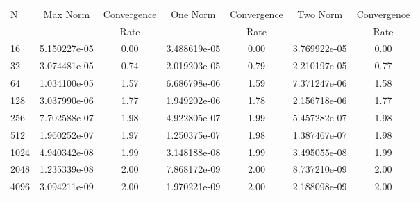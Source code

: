 \documentclass[12pt]{article}
\begin{document}
	\begin{tabular}{l|c|c|c|c|c|c}
		N&Max Norm&Convergence&One Norm&Convergence&Two Norm&Convergence\\
		&&Rate&&Rate&&Rate\\
		\hline
		16&5.150227e-05&0.00&3.488619e-05&0.00&3.769922e-05&0.00\\
		\hline
		32&3.074481e-05&0.74&2.019203e-05&0.79&2.210197e-05&0.77\\
		\hline
		64&1.034100e-05&1.57&6.686798e-06&1.59&7.371247e-06&1.58\\
		\hline
		128&3.037990e-06&1.77&1.949202e-06&1.78&2.156718e-06&1.77\\
		\hline
		256&7.702588e-07&1.98&4.922805e-07&1.99&5.457282e-07&1.98\\
		\hline
		512&1.960252e-07&1.97&1.250375e-07&1.98&1.387467e-07&1.98\\
		\hline
		1024&4.940342e-08&1.99&3.148188e-08&1.99&3.495055e-08&1.99\\
		\hline
		2048&1.235339e-08&2.00&7.868172e-09&2.00&8.737210e-09&2.00\\
		\hline
		4096&3.094211e-09&2.00&1.970221e-09&2.00&2.188098e-09&2.00\\
	\end{tabular}
\end{document}

